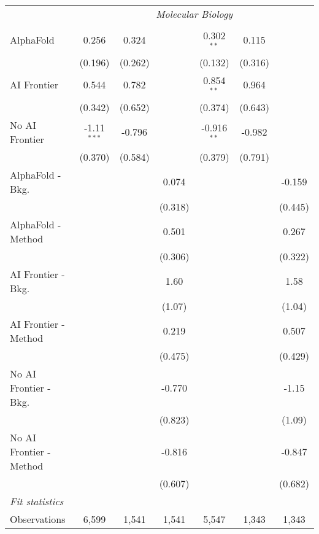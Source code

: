\begin{tabular}{lcccccc}
 & \multicolumn{6}{c}{\textit{Molecular Biology}} \\ \\
   AlphaFold               & 0.256         & 0.324   &         & 0.302$^{**}$  & 0.115   &   \\   
                           & (0.196)       & (0.262) &         & (0.132)       & (0.316) &   \\   
   AI Frontier             & 0.544         & 0.782   &         & 0.854$^{**}$  & 0.964   &   \\   
                           & (0.342)       & (0.652) &         & (0.374)       & (0.643) &   \\   
   No AI Frontier          & -1.11$^{***}$ & -0.796  &         & -0.916$^{**}$ & -0.982  &   \\   
                           & (0.370)       & (0.584) &         & (0.379)       & (0.791) &   \\   
   AlphaFold - Bkg.        &               &         & 0.074   &               &         & -0.159\\   
                           &               &         & (0.318) &               &         & (0.445)\\   
   AlphaFold - Method      &               &         & 0.501   &               &         & 0.267\\   
                           &               &         & (0.306) &               &         & (0.322)\\   
   AI Frontier - Bkg.      &               &         & 1.60    &               &         & 1.58\\   
                           &               &         & (1.07)  &               &         & (1.04)\\   
   AI Frontier - Method    &               &         & 0.219   &               &         & 0.507\\   
                           &               &         & (0.475) &               &         & (0.429)\\   
   No AI Frontier - Bkg.   &               &         & -0.770  &               &         & -1.15\\   
                           &               &         & (0.823) &               &         & (1.09)\\   
   No AI Frontier - Method &               &         & -0.816  &               &         & -0.847\\   
                           &               &         & (0.607) &               &         & (0.682)\\   
   \midrule
   \emph{Fit statistics}\\
   Observations            & 6,599         & 1,541   & 1,541   & 5,547         & 1,343   & 1,343\\  
   

\end{tabular}
